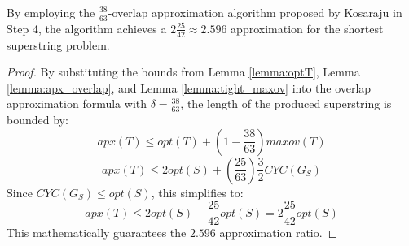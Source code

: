 \begin{table}[htpb]
    \centering
    \caption{History of approximation-ratio improvements for directed
    Max-TSP-Path, and the resulting Shortest Superstring ratio $2 +
    \frac{3}{2}(1-\delta)$ obtained when the algorithm is plugged into Step 4 of
    this section.}
    \label{tab:maxtsp_history}
    \renewcommand{\arraystretch}{1.3}
\end{table}

\begin{theorem}
By employing the $\frac{38}{63}$-overlap approximation algorithm proposed by
Kosaraju in Step 4, the algorithm achieves a $2\frac{25}{42} \approx 2.596$
approximation for the shortest superstring problem.
\end{theorem}

\begin{proof}
By substituting the bounds from Lemma \ref{lemma:optT}, Lemma
\ref{lemma:apx_overlap}, and Lemma \ref{lemma:tight_maxov} into the overlap
approximation formula with $\delta = \frac{38}{63}$, the length of the produced
superstring is bounded by:
\begin{equation}
apx(T) \le opt(T) + \left(1 - \frac{38}{63}\right)\textit{maxov}(T)
\end{equation}
\begin{equation}
apx(T) \le 2opt(S) + \left(\frac{25}{63}\right) \frac{3}{2} CYC(G_S)
\end{equation}
Since $CYC(G_S) \le opt(S)$, this simplifies to:
\begin{equation}
apx(T) \le 2opt(S) + \frac{25}{42} opt(S) = 2\frac{25}{42} opt(S)
\end{equation}
This mathematically guarantees the $2.596$ approximation ratio.
\end{proof}

